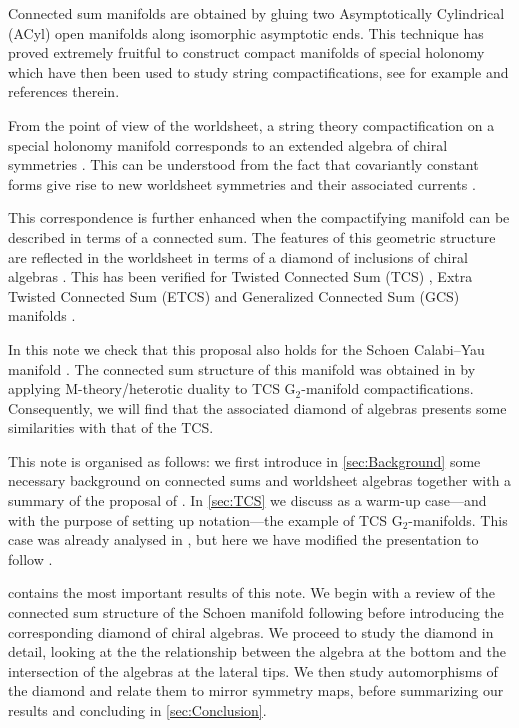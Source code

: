 \documentclass{pspum-l}
\theoremstyle{definition}
\theoremstyle{remark}
\numberwithin{equation}{section}
\begin{document}
Connected sum manifolds are obtained by gluing two Asymptotically Cylindrical (ACyl) open manifolds along isomorphic asymptotic ends. This technique has proved extremely fruitful to construct compact manifolds of special holonomy \cite{Kovalev:2003, Corti:2012, Corti:2012kd, Crowley:2015ctv, Nordstrom:2018cli, Goette:2020, Braun:2018joh} which have then been used to study string compactifications, see for example \cite{Halverson:2014tya, Braun:2017ryx, Braun:2017uku, Braun:2018vhk, Heckman:2018mxl} and references therein.

From the point of view of the worldsheet, a string theory compactification on a special holonomy manifold corresponds to an extended algebra of chiral symmetries \cite{Odake:1988bh, Shatashvili:1994zw, Figueroa-OFarrill:1996tnk}. This can be understood from the fact that covariantly constant forms give rise to new worldsheet symmetries and their associated currents \cite{Howe:1991vs, Howe:1991im,  Howe:1991ic}.

This correspondence is further enhanced when the compactifying manifold can be described in terms of a connected sum. The features of this geometric structure are reflected in the worldsheet in terms of a diamond of inclusions of chiral algebras \cite{Fiset:2021ruv}. This has been verified for Twisted Connected Sum (TCS) \cite{Fiset:2018huv}, Extra Twisted Connected Sum (ETCS) and Generalized Connected Sum (GCS) manifolds \cite{Fiset:2021ruv}.

In this note we check that this proposal also holds for the Schoen Calabi--Yau manifold \cite{Schoen1988}. The connected sum structure of this manifold was obtained in \cite{Braun:2017uku} by applying M-theory/heterotic duality to TCS G$_2$-manifold compactifications. Consequently, we will find that the associated diamond of algebras presents some similarities with that of the TCS.

This note is organised as follows: we first introduce in \cref{sec:Background} some necessary background on connected sums and worldsheet algebras together with a summary of the proposal of \cite{Fiset:2021ruv}. In \cref{sec:TCS} we discuss as a warm-up case---and with the purpose of setting up notation---the example of TCS G$_2$-manifolds. This case was already analysed in \cite{Fiset:2018huv}, but here we have modified the presentation to follow \cite{Fiset:2021ruv}.

 contains the most important results of this note. We begin with a review of the connected sum structure of the Schoen manifold following \cite{Braun:2017uku} before introducing the corresponding diamond of chiral algebras. We proceed to study the diamond in detail, looking at the the relationship between the algebra at the bottom and the intersection of the algebras at the lateral tips. We then study automorphisms of the diamond and relate them to mirror symmetry maps, before summarizing our results and concluding in \cref{sec:Conclusion}.
\end{document}
